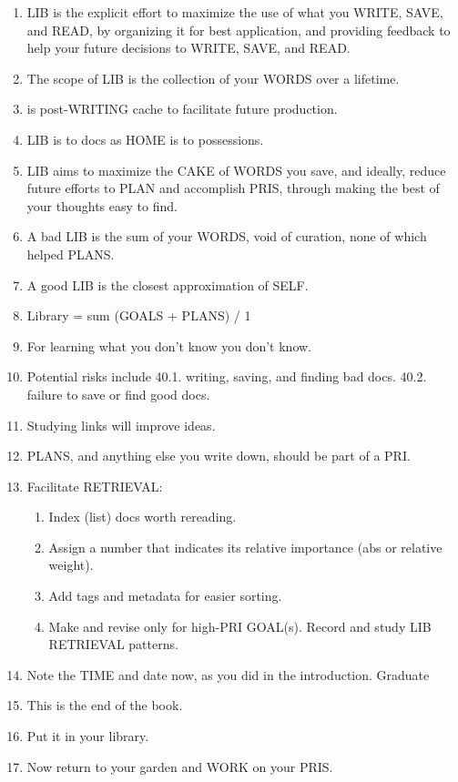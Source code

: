 \documentclass[
]{book}
\providecommand{\tightlist}{%
  \setlength{\itemsep}{0pt}\setlength{\parskip}{0pt}}
\begin{document}
\begin{enumerate}
\def\labelenumi{\arabic{enumi}.}
\setcounter{enumi}{38}
\tightlist
\item
  LIB is the explicit effort to maximize the use of what you WRITE,
  SAVE, and READ, by organizing it for best application, and providing
  feedback to help your future decisions to WRITE, SAVE, and READ.
\item
  The scope of LIB is the collection of your WORDS over a lifetime.
\item
  is post-WRITING cache to facilitate future production.
\item
  LIB is to docs as HOME is to possessions.
\item
  LIB aims to maximize the CAKE of WORDS you save, and ideally, reduce
  future efforts to PLAN and accomplish PRIS, through making the best
  of your thoughts easy to find.
\item
  A bad LIB is the sum of your WORDS, void of curation, none of which
  helped PLANS.
\item
  A good LIB is the closest approximation of SELF.
\item
  Library = sum (GOALS + PLANS) / 1
\item
  For learning what you don't know you don't know.
\item
  Potential risks include 40.1. writing, saving, and finding bad docs.
  40.2. failure to save or find good docs.
\item
  Studying links will improve ideas.
\item
  PLANS, and anything else you write down, should be part of a PRI.
\item
  Facilitate RETRIEVAL:

  \begin{enumerate}
  \def\labelenumii{\arabic{enumii}.}
  \tightlist
  \item
    Index (list) docs worth rereading.
  \item
    Assign a number that indicates its relative importance (abs or
    relative weight).
  \item
    Add tags and metadata for easier sorting.
  \item
    Make and revise only for high-PRI GOAL(s). Record and study LIB
    RETRIEVAL patterns.
  \end{enumerate}
\item
  Note the TIME and date now, as you did in the introduction. Graduate
\item
  This is the end of the book.
\item
  Put it in your library.
\item
  Now return to your garden and WORK on your PRIS.
\end{enumerate}
\end{document}
